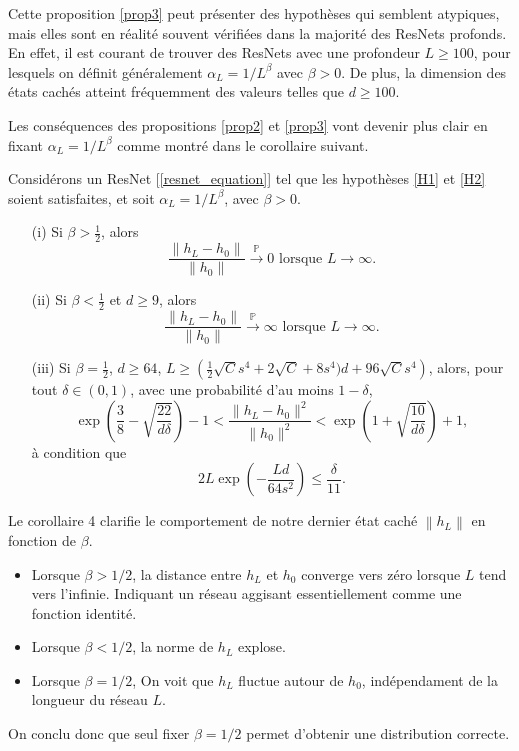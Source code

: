 Cette proposition \ref{prop3} peut présenter des hypothèses qui semblent atypiques, mais elles sont en réalité souvent vérifiées dans la majorité des ResNets profonds. En effet, il est courant de trouver des ResNets avec une profondeur $L \geq 100$, pour lesquels on définit généralement $\alpha_L = 1 / L^\beta$ avec $\beta > 0$. De plus, la dimension des états cachés atteint fréquemment des valeurs telles que $d \geq 100$.

Les conséquences des propositions \ref{prop2} et \ref{prop3} vont devenir plus clair en fixant $ \alpha _L = 1/L ^\beta $ comme montré dans le corollaire suivant.
\begin{cor}\label{cor4}
    Considérons un ResNet [\ref{resnet_equation}] tel que les hypothèses \ref{H1} et \ref{H2} soient satisfaites, et soit $ \alpha_L = 1/L^\beta $, avec $ \beta > 0 $.
    \begin{itemize}
        \item[(i)] Si $ \beta > \frac{1}{2} $, alors
        \[
            \frac{\|h_L - h_0\|}{\|h_0\|} \xrightarrow{\mathbb{P}} 0 \text{ lorsque } L \to \infty.
        \]
        \item[(ii)] Si $ \beta < \frac{1}{2}$ et $d \geq 9 $, alors
        \[
            \frac{\|h_L - h_0\|}{\|h_0\|} \xrightarrow{\mathbb{P}} \infty \text{ lorsque } L \to \infty.
        \]
        \item[(iii)] Si $ \beta = \frac{1}{2} $, $ d \geq 64$, $L \geq \left(\frac{1}{2}\sqrt{C}s^4 + 2\sqrt{C} + 8s^4)d + 96\sqrt{C}s^4\right) $, alors, pour tout $ \delta \in (0, 1) $, avec une probabilité d'au moins $ 1 - \delta $,
        \[
            \exp\left(\frac{3}{8} - \sqrt{\frac{22}{d\delta}}\right) - 1 < \frac{\|h_L - h_0\|^2}{\|h_0\|^2} < \exp\left(1 + \sqrt{\frac{10}{d\delta}}\right) + 1,
        \]
        à condition que
        \[
            2L \exp\left(-\frac{Ld}{64s^2}\right) \leq \frac{\delta}{11}.
        \]
    \end{itemize}
\end{cor}
Le corollaire 4 clarifie le comportement de notre dernier état caché $ \left\| h_L \right\|  $  en fonction de $ \beta  $. 
\begin{itemize}
    \item Lorsque $ \beta > 1/2 $, la distance entre $ h_L $ et $ h_0 $ converge vers zéro lorsque $ L $ tend vers l'infinie. Indiquant un réseau aggisant essentiellement comme une fonction identité.
    \item Lorsque $ \beta < 1/2 $, la norme de $ h_L $ explose.
    \item Lorsque $ \beta = 1/2 $, On voit que $ h_L $ fluctue autour de $ h_0 $, indépendament de la longueur du réseau $ L $.
\end{itemize}
On conclu donc que seul fixer $ \beta = 1/2 $ permet d'obtenir une distribution correcte.

